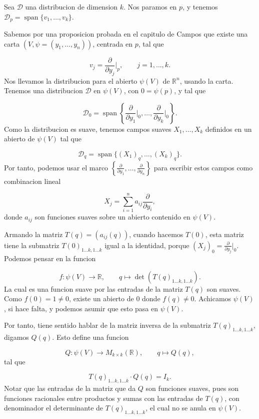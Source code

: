 \begin{bookproof}{}
Sea $\mathcal D$ una distribucion de dimension $k$. Nos paramos en $p$, y tenemos $\mathcal D_p=\operatorname{span}\{v_1,\ldots,v_k\}$.

Sabemos por una proposicion probada en el capitulo de Campos que existe una carta $(V,\psi=(y_1,\ldots,y_n))$, centrada en $p$, tal que

\[
v_j=\frac{\partial}{\partial y_j}\bigg|_p,\qquad j=1,\ldots,k.
\]
Nos llevamos la distribucion para el abierto $\psi(V)$ de $\mathbb R^n$, usando la carta. Tenemos una distribucion $\mathcal D$ en $\psi(V)$, con $0=\psi(p)$, y tal que

\[
\mathcal D_0=\operatorname{span}\left\{\frac{\partial}{\partial y_1}\bigg|_0,\ldots,\frac{\partial}{\partial y_k}\bigg|_0\right\}.
\]
Como la distribucion es suave, tenemos campos suaves $X_1,\ldots,X_k$ definidos en un abierto de $\psi(V)$ tal que

\[
\mathcal D_q=\operatorname{span}\{(X_1)_q,\ldots,(X_k)_q\}.
\]
Por tanto, podemos usar el marco $\left\{\frac{\partial}{\partial y_1},\ldots,\frac{\partial}{\partial y_n}\right\}$ para escribir estos campos como combinacion lineal

\[
X_j=\sum_{i=1}^na_{ij}\frac{\partial}{\partial y_i},
\]
donde $a_{ij}$ son funciones suaves sobre un abierto contenido en $\psi(V)$.

Armando la matriz $T(q)=(a_{ij}(q))$, cuando hacemos $T(0)$, esta matriz tiene la submatriz $T(0)_{1\ldots k,1\ldots k}$ igual a la identidad, porque $(X_j)_0=\frac{\partial}{\partial y_j}\big|_0$. Podemos pensar en la funcion

\[
f:\psi(V)\to\mathbb R,\qquad q\mapsto\det(T(q)_{1\ldots k,1\ldots k}).
\]
La cual es una funcion suave por las entradas de la matriz $T(q)$ son suaves. Como $f(0)=1\ne0$, existe un abierto de $0$ donde $f(q)\ne0$. Achicamos $\psi(V)$, si hace falta, y podemos asumir que esto pasa en $\psi(V)$.

Por tanto, tiene sentido hablar de la matriz inversa de la submatriz $T(q)_{1\ldots k,1\ldots k}$, digamos $Q(q)$. Esto define una funcion

\[
Q:\psi(V)\to M_{k\times k}(\mathbb R),\qquad q\mapsto Q(q),
\]
tal que

\[
T(q)_{1\ldots k,1\ldots k}\cdot Q(q)=I_k.
\]
Notar que las entradas de la matriz que da $Q$ son funciones suaves, pues son funciones racionales entre productos y sumas con las entradas de $T(q)$, con denominador el determinante de $T(q)_{1\ldots k,1\ldots k}$, el cual no se anula en $\psi(V)$.


\end{bookproof}
